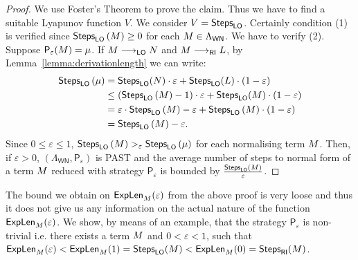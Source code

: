 \begin{proof}
	We use Foster's Theorem to prove the claim. Thus we have to find a suitable Lyapunov function $V$.
	We consider $V=\textsf{Steps}_{\textsf{LO}}$. Certainly condition (1) is verified since $\textsf{Steps}_{\textsf{LO}}\left(M\right)\geq0$ for each $M\in\Lambda_\mathsf{WN}$. We have to verify (2). Suppose $\mathsf{P_\varepsilon}(M)=\mu$. If $M\longrightarrow_{\textsf{LO}}N$ and $M\longrightarrow_{\textsf{RI}}L$, by Lemma~\ref{lemma:derivationlength} we can write:
	\begin{equation*}
	\begin{split}
	\textsf{Steps}_{\textsf{LO}}\left( \mu\right) & = \textsf{Steps}_{\textsf{LO}}(N) \cdot \varepsilon+ \textsf{Steps}_{\textsf{LO}}(L)\cdot (1-\varepsilon)\\
	& \leq \left( \textsf{Steps}_{\textsf{LO}}\left( M\right)-1\right)  \cdot \varepsilon + \textsf{Steps}_{\textsf{LO}}(M)\cdot (1-\varepsilon)\\
	& = \varepsilon\cdot\textsf{Steps}_{\textsf{LO}}\left( M\right)-\varepsilon + \textsf{Steps}_{\textsf{LO}}\left( M\right)\cdot\left( 1-\varepsilon\right)\\
	& = \textsf{Steps}_{\textsf{LO}}\left( M\right)-\varepsilon.
	\end{split}
	\end{equation*}
	Since $0\leq\varepsilon\leq 1$, $\textsf{Steps}_{\textsf{LO}}\left(M\right)>_{\varepsilon}\textsf{Steps}_{\textsf{LO}}\left(\mu\right)$ for each normalising term $M$.
	Then, if $\varepsilon>0$, $(\Lambda_\mathsf{WN},\mathsf{P_\varepsilon})$ is PAST and the average number of steps to normal form of a term $M$ reduced with strategy $\mathsf{P}_\varepsilon$ is bounded by
	$\frac{\textsf{Steps}_{\textsf{LO}}\left( M\right)}{\varepsilon}$.
\end{proof}
The bound we obtain on $\textsf{ExpLen}_{M}(\varepsilon)$ from the above proof is very loose and thus it does not give us any information on the actual nature of the function $\textsf{ExpLen}_{M}(\varepsilon)$. We show, by means of an example, that the strategy $\mathsf{P}_\varepsilon$ is non-trivial i.e. there exists a term $M$ and $0<\varepsilon<1$, such that $\textsf{ExpLen}_{M}(\varepsilon)<\textsf{ExpLen}_{M}(1)=\textsf{Steps}_{\textsf{LO}}(M)<\textsf{ExpLen}_{M}(0)=\textsf{Steps}_{\textsf{RI}}(M)$.
